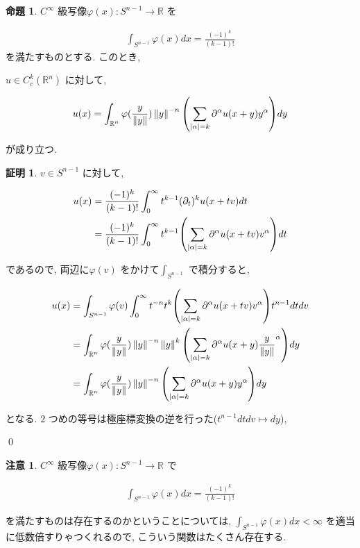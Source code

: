 \documentclass[10pt, fleqn, label-section=none]{bxjsarticle}
\theoremstyle{definition}
\newtheorem{prop}[dfn]{命題}
\newtheorem*{pf*}{証明}
\newtheorem{remark}[dfn]{注意}
\newcommand{\paren}[1]{\mleft( #1\mright )}
\newcommand{\abs}[1]{\left|#1\right|}
\newcommand{\norm}[1]{\left\|#1\right\|}
\renewcommand{\;}{\, ; \,}
\begin{document}
\begin{prop} $C^\infty$ 級写像$\varphi(x): S^{n-1} \rightarrow \mathbb R$ を

\begin{align*} \int_{S^{n-1}} \varphi (x) dx = \frac{(-1)^k}{(k-1)!}   \end{align*} 
を満たすものとする. このとき, 

$u \in C_c^k (\mathbb R^n) $ に対して, 

\begin{align*} u(x) = \int_{\mathbb R^n} \varphi(\frac{y}{\norm y})  \norm y^{-n}   \paren{ \sum_{\abs \alpha = k } \partial^\alpha u(x+y) y^\alpha }   dy        \end{align*}

が成り立つ. 

\end{prop}
\begin{pf*}$v \in S^{n-1}$ に対して, 

\begin{align*} u(x) &= \frac{(-1)^k}{(k-1)!} \int_0^\infty t^{k-1} (\partial_t ) ^k u (x + tv) dt 
\\&=    \frac{(-1)^k}{(k-1)!} \int_0^\infty t^{k-1} \paren{ \sum_{\abs \alpha = k } \partial^\alpha u(x+tv) v^\alpha }         dt    \end{align*}

であるので, 両辺に$\varphi(v)$ をかけて$\int_{S^{n-1}}$ で積分すると, 

\begin{align*} u(x) &= \int_{S^{n-1}} \varphi(v) \int_0^\infty  t^{-n}t^{k} \paren{ \sum_{\abs \alpha = k } \partial^\alpha u(x+tv) v^\alpha }   t^{n-1} dt dv
\\&=  \int_{\mathbb R^n} \varphi(\frac{y}{\norm y})  \norm y^{-n} \norm y ^{k} \paren{ \sum_{\abs \alpha = k } \partial^\alpha u(x+y) {\frac{y}{\norm y}}^\alpha }   dy
\\&= \int_{\mathbb R^n} \varphi(\frac{y}{\norm y})  \norm y^{-n}   \paren{ \sum_{\abs \alpha = k } \partial^\alpha u(x+y) y^\alpha }   dy    \end{align*}

となる. $2$ つめの等号は極座標変換の逆を行った($t^{n-1} dt dv \mapsto dy $),

\qed
\end{pf*}






\begin{remark}$C^\infty$ 級写像$\varphi(x): S^{n-1} \rightarrow \mathbb R$ で

\begin{align*} \int_{S^{n-1}} \varphi (x) dx = \frac{(-1)^k}{(k-1)!}   \end{align*}

を満たすものは存在するのかということについては, $\int_{S^{n-1}} \varphi (x) dx  < \infty$ を適当に低数倍すりゃつくれるので, こういう関数はたくさん存在する. 

\end{remark}
\end{document}
